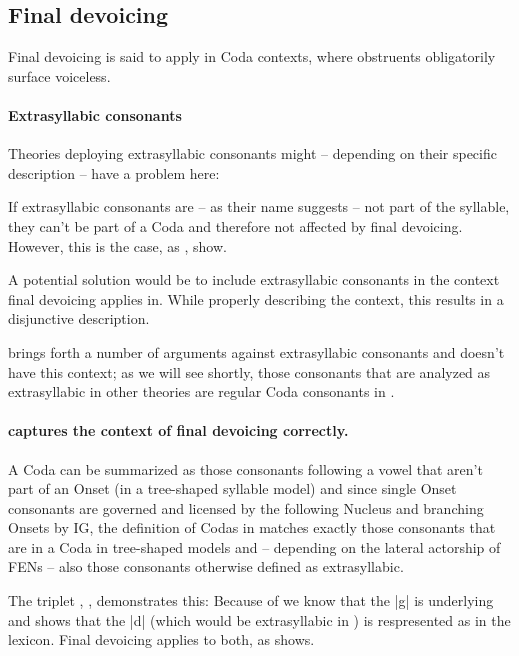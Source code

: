 \subsection{Final devoicing}

Final devoicing is said to apply in Coda contexts,
where obstruents obligatorily surface voiceless.

\paragraph{Extrasyllabic consonants}
Theories deploying extrasyllabic consonants might
-- depending on their specific description --
have a problem here:

If extrasyllabic consonants are -- as their name suggests --
not part of the syllable, they can't be part of a Coda
and therefore not affected by final devoicing.
However, this is the case,
as  \ti{[ma:kt]},  \ti{[ja:kt]} show.

A potential solution would be to include extrasyllabic
consonants in the context final devoicing applies in.
While properly describing the context, this results
in a disjunctive description.

\cite{scheer2004} brings forth a number of arguments
against extrasyllabic consonants and \CVCV doesn't
have this context\footnotemark; as we will see shortly, those
consonants that are analyzed as extrasyllabic in other
theories are regular Coda consonants in \CVCV.

\paragraph{\CVCV captures the context of final devoicing correctly.}
A Coda can be summarized as those consonants following
a vowel that aren't part of an Onset
(in a tree-shaped syllable model) and since single Onset
consonants are governed and licensed by the following
Nucleus and branching Onsets by \gls{IG},
the definition of Codas in \CVCV matches exactly those
consonants that are in a Coda in tree-shaped models
and -- depending on the lateral actorship of \glspl{FEN} --
also those consonants otherwise defined as extrasyllabic.

The triplet , , 
demonstrates this: Because of  we know
that the |g| is underlying and  shows
that the |d| (which would be extrasyllabic in )
is respresented as  in the lexicon.
Final devoicing applies to both, as \ti{[ja:kt]} shows.

